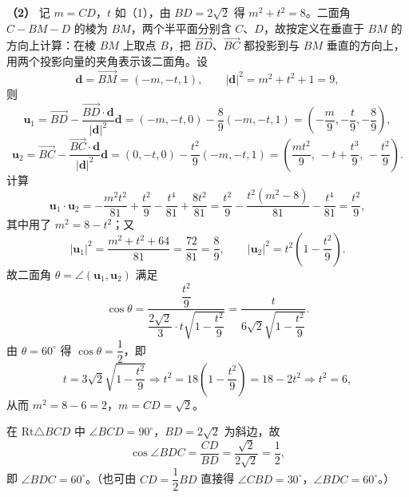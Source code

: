 \begin{answer}
\textbf{（2）} 记 $m=CD$，$t$ 如（1），由 $BD=2\sqrt2$ 得 $m^2+t^2=8$。二面角 $C-BM-D$ 的棱为 $BM$，两个半平面分别含 $C$、$D$，故按定义在垂直于 $BM$ 的方向上计算：在棱 $BM$ 上取点 $B$，把 $\overrightarrow{BD}$、$\overrightarrow{BC}$ 都投影到与 $BM$ 垂直的方向上，用两个投影向量的夹角表示该二面角。设
\nopagebreak[4]
\[\boldsymbol d=\overrightarrow{BM}=(-m,-t,1),\qquad |\boldsymbol d|^2=m^2+t^2+1=9,\]
则
\nopagebreak[4]
\[\boldsymbol u_1=\overrightarrow{BD}-\frac{\overrightarrow{BD}\cdot\boldsymbol d}{|\boldsymbol d|^2}\boldsymbol d
=(-m,-t,0)-\frac89(-m,-t,1)
=\left(-\frac m9,-\frac t9,-\frac89\right),\]
\nopagebreak[4]
\[\boldsymbol u_2=\overrightarrow{BC}-\frac{\overrightarrow{BC}\cdot\boldsymbol d}{|\boldsymbol d|^2}\boldsymbol d
=(0,-t,0)-\frac{t^2}9(-m,-t,1)
=\left(\frac{mt^2}9,\,-t+\frac{t^3}9,\,-\frac{t^2}9\right).\]
计算
\nopagebreak[4]
\[\boldsymbol u_1\cdot\boldsymbol u_2
=-\frac{m^2t^2}{81}+\frac{t^2}9-\frac{t^4}{81}+\frac{8t^2}{81}
=\frac{t^2}9-\frac{t^2(m^2-8)}{81}-\frac{t^4}{81}
=\frac{t^2}9,\]
其中用了 $m^2=8-t^2$；又
\nopagebreak[4]
\[|\boldsymbol u_1|^2=\frac{m^2+t^2+64}{81}=\frac{72}{81}=\frac89,\qquad
|\boldsymbol u_2|^2=t^2\left(1-\frac{t^2}9\right).\]
故二面角 $\theta=\angle(\boldsymbol u_1,\boldsymbol u_2)$ 满足
\nopagebreak[4]
\[\cos\theta=\frac{\dfrac{t^2}9}{\dfrac{2\sqrt2}3\cdot t\sqrt{1-\dfrac{t^2}9}}
=\frac{t}{6\sqrt2\sqrt{1-\dfrac{t^2}9}}.\]
由 $\theta=60^\circ$ 得 $\cos\theta=\dfrac12$，即
\nopagebreak[4]
\[t=3\sqrt2\sqrt{1-\frac{t^2}9}\Longrightarrow t^2=18\left(1-\frac{t^2}9\right)=18-2t^2\Longrightarrow t^2=6,\]
从而 $m^2=8-6=2$，$m=CD=\sqrt2$。

在 $\mathrm{Rt}\triangle BCD$ 中 $\angle BCD=90^\circ$，$BD=2\sqrt2$ 为斜边，故
\nopagebreak[4]
\[\cos\angle BDC=\frac{CD}{BD}=\frac{\sqrt2}{2\sqrt2}=\frac12,\]
即 $\angle BDC=60^\circ$。（也可由 $CD=\dfrac12BD$ 直接得 $\angle CBD=30^\circ$，$\angle BDC=60^\circ$。）



\end{answer}
